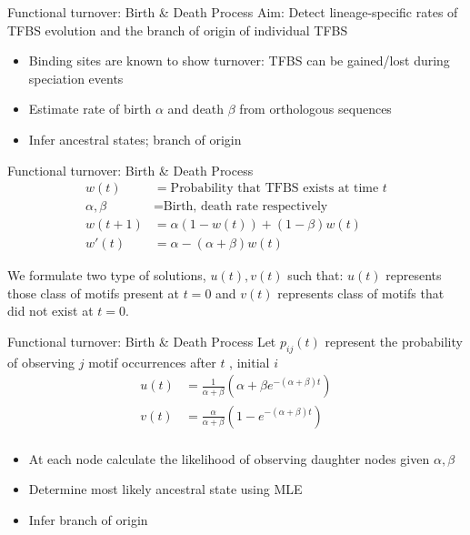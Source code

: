 \documentclass[10pt]{beamer}
\begin{document}
\begin{frame}[fragile]{Functional turnover: Birth \& Death Process}
Aim: Detect lineage-specific rates of TFBS evolution and the branch of origin of individual TFBS
\begin{itemize}
\item Binding sites are known to show turnover: TFBS can be gained/lost during speciation events 
\item Estimate rate of birth $\alpha$ and death $\beta$ from orthologous sequences
\item Infer ancestral states; branch of origin %
\end{itemize}
\end{frame} 

\begin{frame}[fragile]{Functional turnover: Birth \& Death Process}
\begin{align*}
w(t) &= \text{Probability that TFBS exists at time $t$}\\
\alpha,\beta &= \text{Birth, death rate respectively}\\
w(t+1) &= \alpha(1-w(t)) + (1-\beta) w(t)\\
w'(t) &= \alpha - (\alpha+\beta) w(t)
\end{align*}

We formulate two type of solutions, $u(t), v(t)$ such that: $u(t)$ represents those class of motifs present at $t=0$
and $v(t)$ represents class of motifs that did not exist at $t=0$.
\end{frame} 

\begin{frame}[fragile]{Functional turnover: Birth \& Death Process}
Let $p_{ij}(t)$ represent the probability of observing $j$ motif occurrences after $t$ , initial $i$
\begin{align*}
u(t) &= \frac{1}{\alpha+\beta} (\alpha + \beta e^{-(\alpha+\beta)t})\\
v(t) &= \frac{\alpha}{\alpha+\beta} (1-e^{-(\alpha+\beta)t})\\
\end{align*}
\begin{itemize}
\item At each node calculate the likelihood of observing daughter nodes given $\alpha, \beta$
\item Determine most likely ancestral state using MLE
\item Infer branch of origin
\end{itemize}
\end{frame} 
\end{document}
